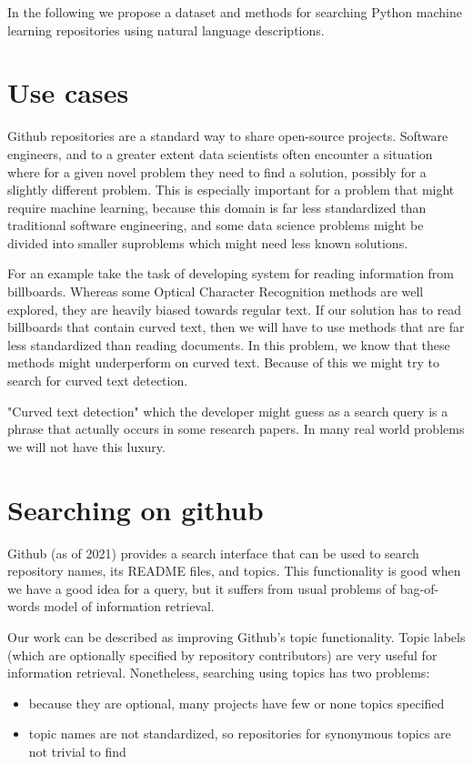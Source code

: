\documentclass[11pt]{report}
\begin{document}
In the following we propose a dataset and methods for searching Python machine learning repositories using natural language descriptions.

\section{Use cases}


Github repositories are a standard way to share open-source projects.
Software engineers, and to a greater extent data scientists often encounter a situation where for a given novel problem they need to find a solution, possibly for a slightly different problem.
This is especially important for a problem that might require machine learning, because this domain is far less standardized than traditional software engineering, and some data science problems might be divided into smaller suproblems which might need less known solutions.

For an example take the task of developing system for reading information from billboards.
Whereas some Optical Character Recognition methods are well explored, they are heavily biased towards regular text.
If our solution has to read billboards that contain curved text, then we will have to use methods that are far less standardized than reading documents.
In this problem, we know that these methods might underperform on curved text. Because of this we might try to search for curved text detection.

"Curved text detection" which the developer might guess as a search query is a phrase that actually occurs in some research papers. In many real world problems we will not have this luxury.

\section{Searching on github}


Github (as of 2021) provides a search interface that can be used to search repository names, its README files, and topics.
This functionality is good when we have a good idea for a query, but it suffers from usual problems of bag-of-words model of information retrieval.

Our work can be described as improving Github's topic functionality. Topic labels (which are optionally specified by repository contributors) are very useful for information retrieval.
Nonetheless, searching using topics has two problems:
\begin{itemize}
\item because they are optional, many projects have few or none topics specified
\item topic names are not standardized, so repositories for synonymous topics are not trivial to find
\end{itemize}
\end{document}
